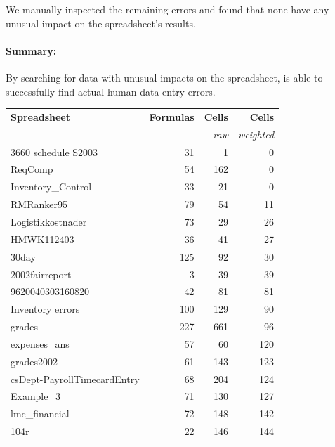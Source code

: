 We manually inspected the remaining errors and found that none
have any unusual impact on the spreadsheet's results.

\paragraph{Summary:} By searching for data with unusual impacts on the spreadsheet, \checkcell{} is able to successfully find actual human data entry errors.

\begin{table}[t!]
  \centering \begin{tabular}{l|rrr} \bf{Spreadsheet}
    & \textsf{\bf{Formulas}} & {\bf{Cells}} & {\bf{Cells}} \\ & &
    {\small{\it{raw}}} & {\small{\it{weighted}}} \\ \hline
\small{3660 schedule S2003} & \small{31} & \small{1} & \small{0} \\ 
\small{ReqComp} & \small{54} & \small{162} & \small{0} \\ 
\small{Inventory\_Control} & \small{33} & \small{21} & \small{0} \\ 
\small{RMRanker95} & \small{79} & \small{54} & \small{11} \\ 
\small{Logistikkostnader} & \small{73} & \small{29} & \small{26} \\ 
\small{HMWK112403} & \small{36} & \small{41} & \small{27} \\ 
\small{30day} & \small{125} & \small{92} & \small{30} \\ 
\small{2002fairreport} & \small{3} & \small{39} & \small{39} \\ 
\small{9620040303160820} & \small{42} & \small{81} & \small{81} \\ 
\small{Inventory errors} & \small{100} & \small{129} & \small{90} \\ 
\small{grades} & \small{227} & \small{661} & \small{96} \\ 
\small{expenses\_ans} & \small{57} & \small{60} & \small{120} \\ 
\small{grades2002} & \small{61} & \small{143} & \small{123} \\ 
\small{csDept-PayrollTimecardEntry} & \small{68} & \small{204} & \small{124} \\ 
\small{Example\_3} & \small{71} & \small{130} & \small{127} \\ 
\small{lmc\_financial} & \small{72} & \small{148} & \small{142} \\ 
\small{104r} & \small{22} & \small{146} & \small{144} \\ 

\end{tabular}
\end{table}
